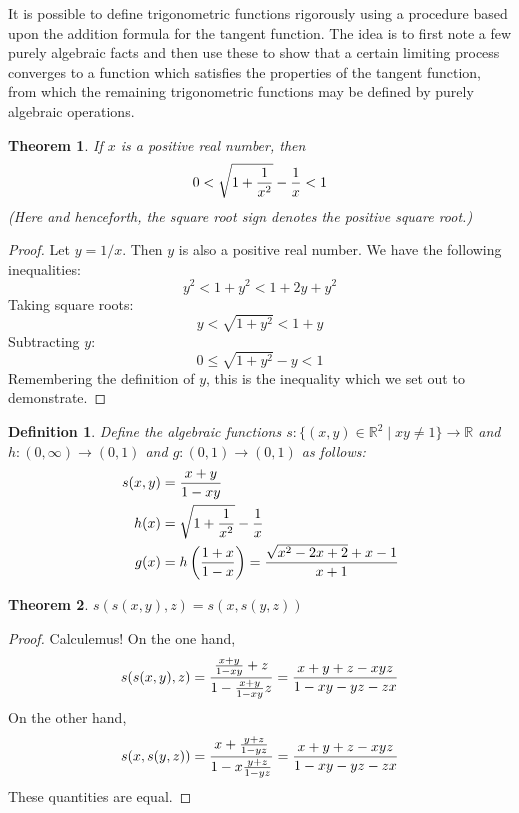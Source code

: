 \documentclass[12pt]{article}
\newtheorem{dfn}{Definition}
\newtheorem{thm}{Theorem}
\begin{document}
It is possible to define trigonometric functions rigorously using a
procedure based upon the addition formula for the tangent function.
The idea is to first note a few purely algebraic facts and then use
these to show that a certain limiting process converges to a function
which satisfies the properties of the tangent function, from which
the remaining trigonometric functions may be defined by purely
algebraic operations.

\begin{thm}
If $x$ is a positive real number, then
\[
 0 < \sqrt{1 + {1 \over x^2}} - {1 \over x} < 1
\]
(Here and henceforth, the square root sign denotes
the positive square root.)
\end{thm}

\begin{proof}
Let $y = 1/x$.  Then $y$ is also a positive real number.
We have the following inequalities:
\[
 y^2 < 1 + y^2 < 1 + 2y + y^2
\]
Taking square roots:
\[
 y < \sqrt{1 + y^2} < 1 + y
\]
Subtracting $y$:
\[
 0 \le \sqrt{1 + y^2} - y < 1
\]
Remembering the definition of $y$, this is the
inequality which we set out to demonstrate.
\end{proof}

\begin{dfn}
Define the algebraic functions $s \colon 
\{ (x,y) \in \mathbb{R}^2 \mid xy \neq 1 \} \to \mathbb{R}$ 
and $h \colon (0,\infty) \to (0,1)$ and 
$g \colon (0,1) \to (0,1)$ as follows:
\begin{align}
s(x,y) &= {x + y \over 1 - x y} \\
h(x) &= \sqrt{1 + {1 \over x^2}} - {1 \over x} \\
g(x) &= h \left( {1 + x \over 1 - x} \right)
      = {\sqrt{x^2 - 2 x + 2} + x - 1 \over x + 1}
\end{align}
\end{dfn}

\begin{thm}
$s(s(x,y),z) = s(x,s(y,z))$
\end{thm}

\begin{proof}
Calculemus!  On the one hand,
\[
s(s(x,y),z) = 
{{x + y \over 1 - x y} + z \over
 1 - {x + y \over 1 - x y} z} \\ =
{x + y + z - xyz \over 1 - xy - yz - zx}
\]
On the other hand,
\[
s(x,s(y,z)) =
{x + {y + z \over 1 - yz} \over
 1 - x {y + z \over 1 - yz}} =
{x + y + z - xyz \over 1 - xy - yz - zx}
\]
These quantities are equal.
\end{proof}
\end{document}
